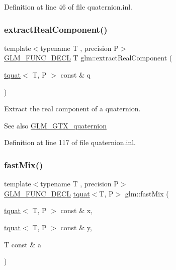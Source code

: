Definition at line 46 of file quaternion.\+inl.

\mbox{\label{group__gtx__quaternion_ga90de879d97487ec804522dd418e5d8a0}} 
\subsubsection{\texorpdfstring{extractRealComponent()}{extractRealComponent()}}
{\footnotesize\ttfamily template$<$typename T , precision P$>$ \\
\mbox{\hyperlink{setup_8hpp_ab2d052de21a70539923e9bcbf6e83a51}{G\+L\+M\+\_\+\+F\+U\+N\+C\+\_\+\+D\+E\+CL}} T glm\+::extract\+Real\+Component (\begin{DoxyParamCaption}\item[{\mbox{\hyperlink{structglm_1_1tquat}{tquat}}$<$ T, P $>$ const \&}]{q }\end{DoxyParamCaption})}

Extract the real component of a quaternion.

\begin{DoxySeeAlso}{See also}
\mbox{\hyperlink{group__gtx__quaternion}{G\+L\+M\+\_\+\+G\+T\+X\+\_\+quaternion}} 
\end{DoxySeeAlso}


Definition at line 117 of file quaternion.\+inl.

\mbox{\label{group__gtx__quaternion_gac11bf550f17d1da14423595a27575084}} 
\subsubsection{\texorpdfstring{fastMix()}{fastMix()}}
{\footnotesize\ttfamily template$<$typename T , precision P$>$ \\
\mbox{\hyperlink{setup_8hpp_ab2d052de21a70539923e9bcbf6e83a51}{G\+L\+M\+\_\+\+F\+U\+N\+C\+\_\+\+D\+E\+CL}} \mbox{\hyperlink{structglm_1_1tquat}{tquat}}$<$T, P$>$ glm\+::fast\+Mix (\begin{DoxyParamCaption}\item[{\mbox{\hyperlink{structglm_1_1tquat}{tquat}}$<$ T, P $>$ const \&}]{x,  }\item[{\mbox{\hyperlink{structglm_1_1tquat}{tquat}}$<$ T, P $>$ const \&}]{y,  }\item[{T const \&}]{a }\end{DoxyParamCaption})}

